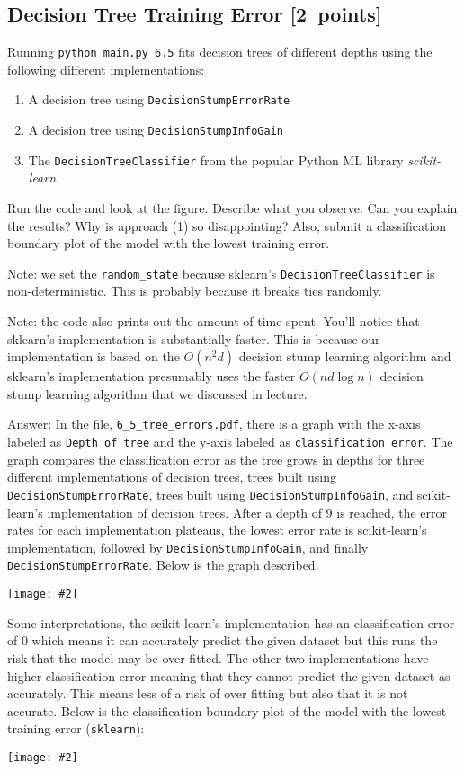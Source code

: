 \documentclass{article}
\newcommand{\blu}[1]{{\textcolor{blu}{#1}}}
\newcommand{\gre}[1]{\textcolor{gre}{#1}}
\newcommand\ans[1]{\par\gre{Answer: #1}}
\let\ask\blu
\newcommand\pts[1]{\textcolor{pointscolour}{[#1~points]}}
\newcommand{\centerfig}[2]{\begin{center}\texttt{[image: \#2]}\end{center}}
\begin{document}
  \subsection{Decision Tree Training Error \pts{2}}

  Running \texttt{python main.py 6.5} fits decision trees of different depths using the following different implementations:
  \begin{enumerate}
  \item A decision tree using \texttt{DecisionStumpErrorRate}
  \item A decision tree using \texttt{DecisionStumpInfoGain}
  \item The \texttt{DecisionTreeClassifier} from the popular Python ML library \emph{scikit-learn}
  \end{enumerate}

  Run the code and look at the figure.
  \ask{Describe what you observe. Can you explain the results?} Why is approach (1) so disappointing? Also, \ask{submit a classification boundary plot of the model with the lowest training error}.

  Note: we set the \verb|random_state| because sklearn's \texttt{DecisionTreeClassifier} is non-deterministic. This is probably
  because it breaks ties randomly.

  Note: the code also prints out the amount of time spent. You'll notice that sklearn's implementation is substantially faster. This is because
  our implementation is based on the $O(n^2d)$ decision stump learning algorithm and sklearn's implementation presumably uses the faster $O(nd\log n)$
  decision stump learning algorithm that we discussed in lecture.
  \ans{ \newline In the file, \texttt{6\_5\_tree\_errors.pdf}, there is a graph with the x-axis labeled as \texttt{Depth of tree} and the y-axis labeled as \texttt{classification error}. The graph compares the classification error as the tree grows in depths for three different implementations of decision trees, trees built using \texttt{DecisionStumpErrorRate}, trees built using \texttt{DecisionStumpInfoGain}, and scikit-learn's implementation of decision trees. After a depth of 9 is reached, the error rates for each implementation plateaus, the lowest error rate is scikit-learn's implementation, followed by \texttt{DecisionStumpInfoGain}, and finally \texttt{DecisionStumpErrorRate}. Below is the graph described.\centerfig{0.7}{./figs/q6_5_tree_errors}Some interpretations, the scikit-learn's implementation has an classification error of 0 which means it can accurately predict the given dataset but this runs the risk that the model may be over fitted. The other two implementations have higher classification error meaning that they cannot predict the given dataset as accurately. This means less of a risk of over fitting but also that it is not accurate. Below is the classification boundary plot of the model with the lowest training error (\texttt{sklearn}):\centerfig{0.7}{./figs/q6_5_decisionBoundary}}
\end{document}
